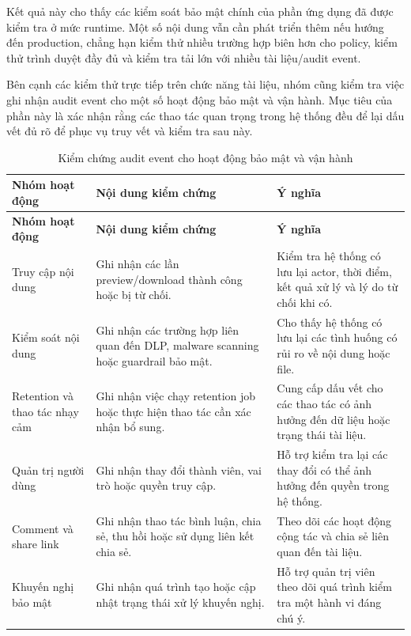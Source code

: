 Kết quả này cho thấy các kiểm soát bảo mật chính của phần ứng dụng đã được kiểm tra ở mức runtime. Một số nội dung vẫn cần phát triển thêm nếu hướng đến production, chẳng hạn kiểm thử nhiều trường hợp biên hơn cho policy, kiểm thử trình duyệt đầy đủ và kiểm tra tải lớn với nhiều tài liệu/audit event.

Bên cạnh các kiểm thử trực tiếp trên chức năng tài liệu, nhóm cũng kiểm tra việc ghi nhận audit event cho một số hoạt động bảo mật và vận hành. Mục tiêu của phần này là xác nhận rằng các thao tác quan trọng trong hệ thống đều để lại dấu vết đủ rõ để phục vụ truy vết và kiểm tra sau này.

\begin{longtable}{p{}p{}p{}}
\caption{Kiểm chứng audit event cho hoạt động bảo mật và vận hành}
\label{tab:security-operations-audit-evidence} \\
\toprule
\textbf{Nhóm hoạt động} & \textbf{Nội dung kiểm chứng} & \textbf{Ý nghĩa} \\
\midrule
\endfirsthead
\toprule
\textbf{Nhóm hoạt động} & \textbf{Nội dung kiểm chứng} & \textbf{Ý nghĩa} \\
\midrule
\endhead
Truy cập nội dung & Ghi nhận các lần preview/download thành công hoặc bị từ chối. & Kiểm tra hệ thống có lưu lại actor, thời điểm, kết quả xử lý và lý do từ chối khi có. \\
Kiểm soát nội dung & Ghi nhận các trường hợp liên quan đến DLP, malware scanning hoặc guardrail bảo mật. & Cho thấy hệ thống có lưu lại các tình huống có rủi ro về nội dung hoặc file. \\
Retention và thao tác nhạy cảm & Ghi nhận việc chạy retention job hoặc thực hiện thao tác cần xác nhận bổ sung. & Cung cấp dấu vết cho các thao tác có ảnh hưởng đến dữ liệu hoặc trạng thái tài liệu. \\
Quản trị người dùng & Ghi nhận thay đổi thành viên, vai trò hoặc quyền truy cập. & Hỗ trợ kiểm tra lại các thay đổi có thể ảnh hưởng đến quyền trong hệ thống. \\
Comment và share link & Ghi nhận thao tác bình luận, chia sẻ, thu hồi hoặc sử dụng liên kết chia sẻ. & Theo dõi các hoạt động cộng tác và chia sẻ liên quan đến tài liệu. \\
Khuyến nghị bảo mật & Ghi nhận quá trình tạo hoặc cập nhật trạng thái xử lý khuyến nghị. & Hỗ trợ quản trị viên theo dõi quá trình kiểm tra một hành vi đáng chú ý. \\
\bottomrule
\end{longtable}

